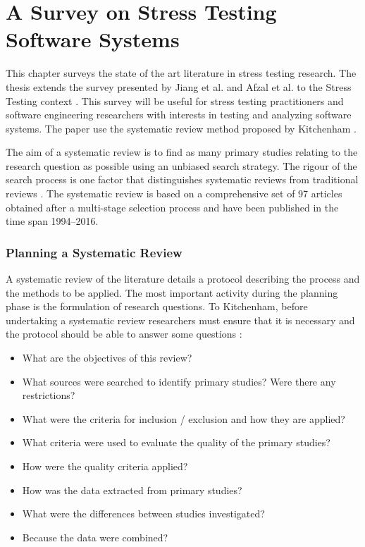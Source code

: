 \documentclass{report}
\begin{document}
\chapter{A Survey on Stress Testing Software Systems}


This chapter surveys the state of the art literature in stress testing research. The thesis extends the survey presented by Jiang et al. \cite{Jiang2010}  and Afzal et al. \cite{Afzal2009a} to the Stress Testing context .  This survey will be useful for stress testing practitioners and software engineering researchers with interests in testing and analyzing software systems. The paper use the systematic review method proposed by Kitchenham \cite{Kitchenham2007}.



The aim of a systematic review is to find as many primary studies relating to the research question as possible using an unbiased search strategy. The rigour of the search process is one factor that distinguishes systematic reviews from traditional reviews \cite{Kitchenham2007}. The systematic review is based on a comprehensive set of 97 articles obtained after a multi-stage selection process and have been published in the time span 1994–2016.




\subsection{Planning a Systematic Review}

A systematic review of the literature details a protocol describing the process and the methods to be applied. The most important activity during the
planning phase is the formulation of research questions. To Kitchenham,
before undertaking a systematic review researchers must ensure that it is necessary and the protocol should be able to answer some questions \cite{Marinho2014}:

\begin{itemize}
\item What are the objectives of this review?
\item What sources were searched to identify primary studies? Were there any restrictions?
\item What were the criteria for inclusion / exclusion and how they are applied?
\item What criteria were used to evaluate the quality of the primary studies?
\item How were the quality criteria applied?
\item How was the data extracted from primary studies?
\item What were the differences between studies investigated?
\item  Because the data were combined?
\end{itemize}
\end{document}
